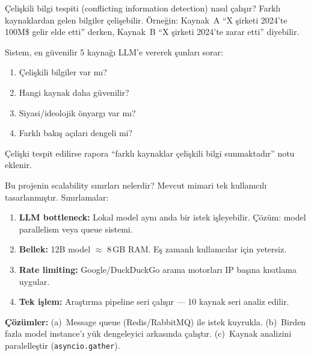\begin{mulakat}{\c{C}eli\c{s}kili bilgi tespiti (conflicting information detection) nas{\i}l \c{c}al{\i}\c{s}{\i}r?}
Farkl{\i} kaynaklardan gelen bilgiler \c{c}eli\c{s}ebilir. \"{O}rne\u{g}in: Kaynak~A ``X \c{s}irketi 2024'te 100M\$ gelir elde etti'' derken, Kaynak~B ``X \c{s}irketi 2024'te zarar etti'' diyebilir.

Sistem, en g\"{u}venilir 5 kayna\u{g}{\i} LLM'e vererek \c{s}unlar{\i} sorar:
\begin{enumerate}
  \item \c{C}eli\c{s}kili bilgiler var m{\i}?
  \item Hangi kaynak daha g\"{u}venilir?
  \item Siyasi/ideolojik \"{o}nyarg{\i} var m{\i}?
  \item Farkl{\i} bak{\i}\c{s} a\c{c}{\i}lar{\i} dengeli mi?
\end{enumerate}

\c{C}eli\c{s}ki tespit edilirse rapora ``farkl{\i} kaynaklar \c{c}eli\c{s}kili bilgi sunmaktad{\i}r'' notu eklenir.
\end{mulakat}

\begin{mulakat}{Bu projenin scalability s{\i}n{\i}rlar{\i} nelerdir?}
Mevcut mimari tek kullan{\i}c{\i}l{\i} tasarlanm{\i}\c{s}t{\i}r. S{\i}n{\i}rlamalar:

\begin{enumerate}
  \item \textbf{LLM bottleneck:} Lokal model ayn{\i} anda bir istek i\c{s}leyebilir. \c{C}\"{o}z\"{u}m: model parallelism veya queue sistemi.
  \item \textbf{Bellek:} 12B model $\approx$ 8\,GB RAM. E\c{s} zamanl{\i} kullan{\i}c{\i}lar i\c{c}in yetersiz.
  \item \textbf{Rate limiting:} Google/DuckDuckGo arama motorlar{\i} IP ba\c{s}{\i}na k{\i}s{\i}tlama uygular.
  \item \textbf{Tek i\c{s}lem:} Ara\c{s}t{\i}rma pipeline seri \c{c}al{\i}\c{s}{\i}r --- 10 kaynak seri analiz edilir.
\end{enumerate}

\textbf{\c{C}\"{o}z\"{u}mler:} (a)~Message queue (Redis/RabbitMQ) ile istek kuyrukla. (b)~Birden fazla model instance'{\i} y\"{u}k dengeleyici arkas{\i}nda \c{c}al{\i}\c{s}t{\i}r. (c)~Kaynak analizini paralelle\c{s}tir (\texttt{asyncio.gather}).
\end{mulakat}

